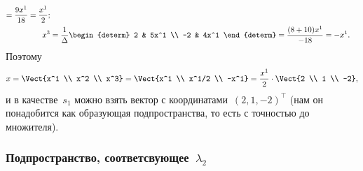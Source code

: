 \begin{solution}
\begin{align*}
			=
			\frac{9x^1}{18}
			=
			\frac{x^1}{2}
			;
			\\
			x^3 &=
			\frac{1}{\Delta}
			\begin{determ}
				 2 & 5x^1 \\
				-2 & 4x^1
			\end{determ}
			=
			\frac{(8+10)x^1}{-18}
			=
			-x^1
			.
		\end{align*}
		Поэтому
		\[
			x =
			\Vect{x^1 \\ x^2 \\ x^3}
			=
			\Vect{x^1 \\ x^1/2 \\ -x^1}
			=
			\frac{x^1}{2} \cdot
			\Vect{2 \\ 1 \\ -2}
			,
		\]
		и в качестве~$s_1$ можно взять вектор с координатами~$(2, 1, -2)^\top$ (нам он понадобится как образующая подпространства, то есть с точностью до множителя).

	\subsubsection[Подпространство, соответсвующее~$\lambda_2$]{Подпространство, соответсвующее~$\lambda_2$}


\end{solution}
